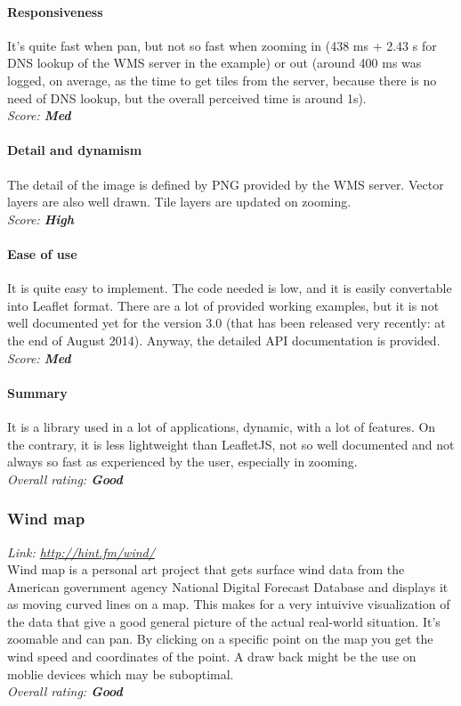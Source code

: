 \documentclass[11pt,a4paper,titlepage,oneside]{report}
\begin{document}
   \paragraph{Responsiveness}
   It's quite fast when pan, but not so fast when zooming in (438 ms + 2.43 s for DNS lookup of the \gls{WMS} server in the example) or out (around 400 ms was logged, on average, as the time to get tiles from the server, because there is no need of DNS lookup, but the overall perceived time is around 1s).
   \\ \emph{Score: \textbf{Med}}
   \paragraph{Detail and dynamism}
   The detail of the image is defined by \gls{PNG} provided by the \gls{WMS} server. Vector layers are also well drawn. Tile layers are updated on zooming.
   \\ \emph{Score: \textbf{High}}
   \paragraph{Ease of use}
   It is quite easy to implement. The code needed is low, and it is easily convertable into Leaflet format. There are a lot of provided working examples, but it is not well documented yet for the version 3.0 (that has been released very recently: at the end of August 2014). Anyway, the detailed \gls{API} documentation is provided.
   \\ \emph{Score: \textbf{Med}}
   \paragraph{Summary}
   It is a library used in a lot of applications, dynamic, with a lot of features. On the contrary, it is less lightweight than LeafletJS, not so well documented and not always so fast as experienced by the user, especially in zooming.
   \\ \emph{Overall rating: \textbf{Good}}
  
  \subsubsection{Wind map}
  \emph{Link: \url{http://hint.fm/wind/}} \\%
    Wind map is a personal art project that gets surface wind data from the American government agency National Digital Forecast Database and displays it as moving curved lines on a map. This makes for a very intuivive visualization of the data that give a good general picture of the actual real-world situation. It's zoomable and can pan. By clicking on a specific point on the map you get the wind speed and coordinates of the point. A draw back might be the use on moblie devices which may be suboptimal.
  \\ \emph{Overall rating: \textbf{Good}}
\end{document}
